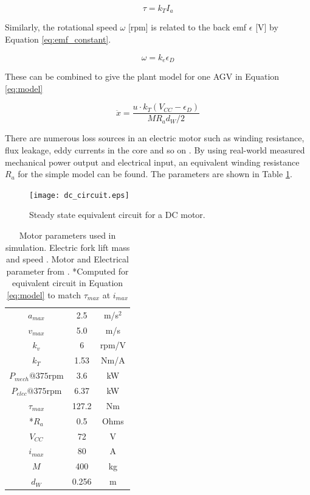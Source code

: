 \begin{equation}
\tau = k_T I_a
\label{eq:torque_constant}
\end{equation} 

Similarly, the rotational speed $\omega$ [rpm] is related to the back emf $\epsilon$ [V] by Equation \ref{eq:emf_constant}.

\begin{equation}
\omega = {k_e}\epsilon_D 
\label{eq:emf_constant}
\end{equation}

These can be combined to give the plant model for one AGV in Equation \ref{eq:model}

\begin{equation}
\ddot{x} =\frac{ u \cdot k_T (V_{CC} - \epsilon_D) }{M R_a d_W/2}
\label{eq:model}
\end{equation}

 There are numerous loss sources in an electric motor such as winding resistance, flux leakage, eddy currents in the core and so on \cite{Sarlioglu2016}. By using real-world measured mechanical power output and electrical input, an equivalent winding resistance $R_a$ for the simple model can be found. The parameters are shown in Table \ref{tab:motor_params}.

\begin{figure}[ht]
	\centering
	\texttt{[image: dc\_circuit.eps]}
	\caption{Steady state equivalent circuit for a DC motor.}
	\label{fig:dc_circuit}
\end{figure}


 \begin{table}
 	\caption{Motor parameters used in simulation. Electric fork lift mass and speed \cite{Hyster2020a}. Motor and Electrical parameter from \cite{Racewicz2018}. *Computed for equivalent circuit in Equation \ref{eq:model} to match $\tau_{max}$ at $i_{max}$ }
 	\label{tab:motor_params} 
 	\centering
 	\begin{tabular}{ |c|c|c| }
 		\hline
 		$a_{max}$ & 2.5 & m/s$^2$\\
 		$v_{max}$ & 5.0& m/s \\
 		$k_v$ & 6 & rpm/V\\ 
 		$k_T$ & 1.53 & Nm/A\\ 
 		$P_{mech}@375$rpm & 3.6 & kW\\ 
 		$P_{elec}@375$rpm & 6.37 & kW \\
 		$\tau_{max}$ & 127.2 & Nm\\
 		*$R_a$ & 0.5 & Ohms\\
 		$V_{CC}$ & 72 & V\\
 		$i_{max}$ & 80 & A\\
 		$M$ & 400 & kg\\
 		$d_W$ & 0.256 & m\\
 		\hline
 	\end{tabular}
 \end{table}

